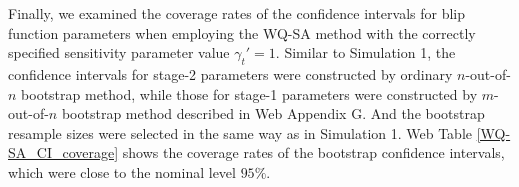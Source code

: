 \documentclass[12pt]{article}
\begin{document}
Finally, we examined the coverage rates of the confidence intervals for blip function parameters when employing the WQ-SA method with the correctly specified sensitivity parameter value $\gamma_t'=1$. 
Similar to Simulation 1, the confidence intervals for stage-2 parameters were constructed by ordinary $n$-out-of-$n$ bootstrap method, while those for stage-1 parameters were constructed by $m$-out-of-$n$ bootstrap method described in Web Appendix G. And the bootstrap resample sizes were selected in the  same way as in Simulation 1. 
Web Table \ref{WQ-SA_CI_coverage} shows the coverage rates of the bootstrap confidence intervals, which were close to the nominal level $95\%$.   

\end{document}
